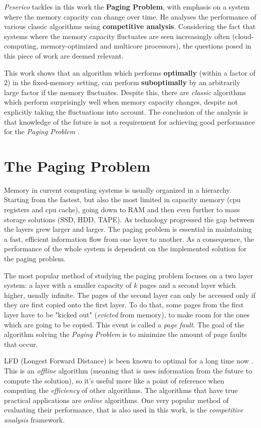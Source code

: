 \emph{Peserico} tackles in this work the \textbf{Paging Problem}, with emphasis
on a system where the memory capacity can change over time. He analyses the
performance of various classic algorithms using \textbf{competitive analysis}.
Considering the fact that systems where the memory capacity fluctuates are seen
increasingly often (cloud-computing, memory-optimized and multicore
processors), the questions posed in this piece of work are deemed relevant.

This work shows that an algorithm which performs \textbf{optimally} (within
a factor of $2$) in the fixed-memory setting, can perform \textbf{suboptimally}
by an arbitrarily large factor if the memory fluctuates. Despite this, there
are \emph{classic} algorithms which perform surprisingly well when memory
capacity changes, despite not explicitly taking the fluctuations into account.
The conclusion of the analysis is that knowledge of the future is not a requirement
for achieving good performance for the \emph{Paging Problem} \cite{peserico2013paging}. 

\section*{The Paging Problem \cite{peserico2013paging3}}

Memory in current computing systems is usually organized in a hierarchy.
Starting from the fastest, but also the most limited in capacity memory (cpu
registers and cpu cache), going down to RAM and then even further to mass
storage solutions (SSD, HDD, TAPE). As technology progressed the gap between
the layers grew larger and larger. The paging problem is essential in
maintaining a fast, efficient information flow from one layer to another. As a
consequence, the performance of the whole system is dependent on the
implemented solution for the paging problem.

The most popular method of studying the paging problem focuses on a two layer
system: a layer with a smaller capacity of $k$ pages and a second layer which
higher, usually infinite. The pages of the second layer can only be accessed
only if they are first copied onto the first layer. To do that, some pages from
the first layer have to be "kicked out" (\emph{evicted} from memory), to make
room for the ones which are going to be copied. This event is called a
\emph{page fault}. The goal of the algorithm solving the \emph{Paging Problem}
is to minimize the amount of page faults that occur.

LFD (Longest Forward Distance) is been known to optimal for a long time now
\cite{belady1966study}. This is an \emph{offline} algorithm (meaning that is
uses information from the future to compute the solution), so it's useful more
like a point of reference when computing the \emph{efficiency} of other
algorithms. The algorithms that have true practical applications are
\emph{online} algorithms. One very popular method of evaluating their
performance, that is also used in this work, is the \emph{competitive analysis}
framework.

